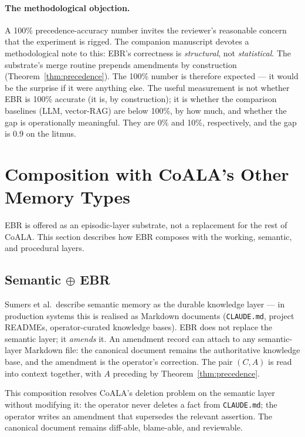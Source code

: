 \documentclass[11pt,a4paper]{article}
\begin{document}
\paragraph{The methodological objection.}
A 100\% precedence-accuracy number invites the reviewer's reasonable concern that the
experiment is rigged. The companion manuscript devotes a methodological note to this:
EBR's correctness is \emph{structural}, not \emph{statistical}. The substrate's merge
routine prepends amendments by construction (Theorem~\ref{thm:precedence}). The 100\%
number is therefore expected --- it would be the surprise if it were anything else. The
useful measurement is not whether EBR is 100\% accurate (it is, by construction); it is
whether the comparison baselines (LLM, vector-RAG) are below 100\%, by how much, and
whether the gap is operationally meaningful. They are 0\% and 10\%, respectively, and
the gap is $0.9$ on the litmus.

\section{Composition with CoALA's Other Memory Types}
\label{sec:composition}

\noindent
EBR is offered as an episodic-layer substrate, not a replacement for the rest of CoALA.
This section describes how EBR composes with the working, semantic, and procedural
layers.

\subsection{Semantic $\oplus$ EBR}
\label{sec:semantic-plus-ebr}

\noindent
Sumers et al.\ describe semantic memory as the durable knowledge layer --- in production
systems this is realised as Markdown documents (\texttt{CLAUDE.md}, project READMEs,
operator-curated knowledge bases). EBR does not replace the semantic layer; it
\emph{amends} it. An amendment record can attach to any semantic-layer Markdown file:
the canonical document remains the authoritative knowledge base, and the amendment is
the operator's correction. The pair $(C, A)$ is read into context together, with $A$
preceding by Theorem~\ref{thm:precedence}.

This composition resolves CoALA's deletion problem on the semantic layer without
modifying it: the operator never deletes a fact from \texttt{CLAUDE.md}; the operator
writes an amendment that supersedes the relevant assertion. The canonical document
remains diff-able, blame-able, and reviewable.
\end{document}
